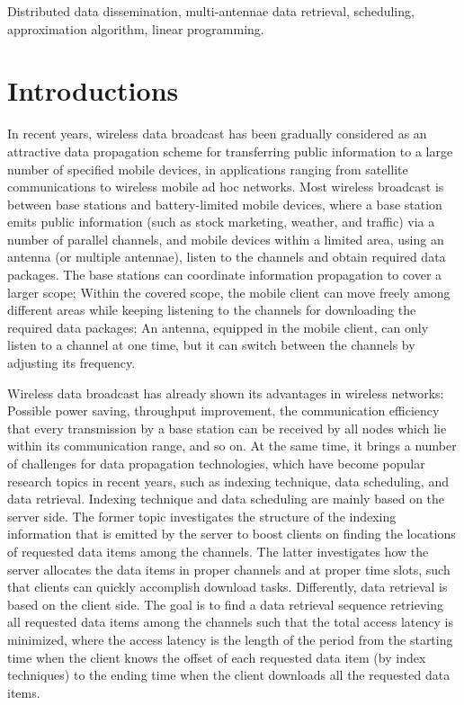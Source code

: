 \documentclass[11pt,english,onecolumn,draftcls]{IEEEtran}
\theoremstyle{plain}
\theoremstyle{plain}
\theoremstyle{plain}
\theoremstyle{plain}
\begin{document}
\begin{IEEEkeywords}
Distributed data dissemination, multi-antennae data retrieval, scheduling,
approximation algorithm, linear programming.
\end{IEEEkeywords}


\section{Introductions}

In recent years, wireless data broadcast has been gradually considered
as an attractive data propagation scheme for transferring public information
to a large number of specified mobile devices, in applications ranging
from satellite communications to wireless mobile ad hoc networks.
Most wireless broadcast is between base stations and battery-limited
mobile devices, where a base station emits public information (such
as stock marketing, weather, and traffic) via a number of parallel
channels, and mobile devices within a limited area, using an antenna
(or multiple antennae), listen to the channels and obtain required
data packages. The base stations can coordinate information propagation
to cover a larger scope; Within the covered scope, the mobile client
can move freely among different areas while keeping listening to the
channels for downloading the required data packages; An antenna, equipped
in the mobile client, can only listen to a channel at one time, but
it can switch between the channels by adjusting its frequency.

Wireless data broadcast has already shown its advantages in wireless
networks: Possible power saving, throughput improvement, the communication
efficiency that every transmission by a base station can be received
by all nodes which lie within its communication range, and so on.
At the same time, it brings a number of challenges for data propagation
technologies, which have become popular research topics in recent
years, such as indexing technique, data scheduling, and data retrieval.
Indexing technique and data scheduling are mainly based on the server
side. The former topic investigates the structure of the indexing
information that is emitted by the server to boost clients on finding
the locations of requested data items among the channels. The latter
investigates how the server allocates the data items in proper channels
and at proper time slots, such that clients can quickly accomplish
download tasks. Differently, data retrieval is based on the client
side. The goal is to find a data retrieval sequence retrieving all
requested data items among the channels such that the total access
latency is minimized, where the access latency is the length of the
period from the starting time when the client knows the offset of
each requested data item (by index techniques) to the ending time
when the client downloads all the requested data items.
\end{document}
